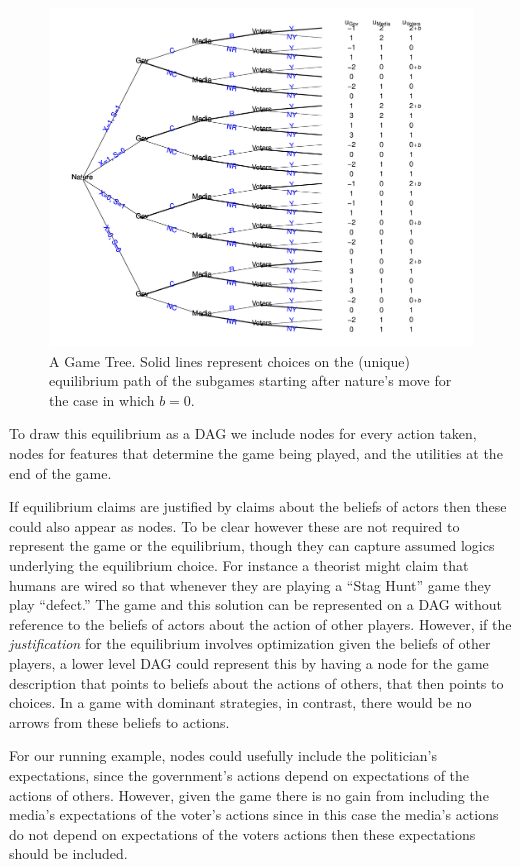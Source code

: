 \documentclass[12pt,]{book}
\begin{document}
\begin{figure}
\centering
\includegraphics{ii_files/figure-latex/tree-1.pdf}
\caption{\label{fig:tree}\label{fig:tree} A Game Tree. Solid lines represent choices on the (unique) equilibrium path of the subgames starting after nature's move for the case in which \(b=0\).}
\end{figure}

To draw this equilibrium as a DAG we include nodes for every action taken, nodes for features that determine the game being played, and the utilities at the end of the game.

If equilibrium claims are justified by claims about the beliefs of actors then these could also appear as nodes. To be clear however these are not required to represent the game or the equilibrium, though they can capture assumed logics underlying the equilibrium choice. For instance a theorist might claim that humans are wired so that whenever they are playing a ``Stag Hunt'' game they play ``defect.'' The game and this solution can be represented on a DAG without reference to the beliefs of actors about the action of other players. However, if the \emph{justification} for the equilibrium involves optimization given the beliefs of other players, a lower level DAG could represent this by having a node for the game description that points to beliefs about the actions of others, that then points to choices. In a game with dominant strategies, in contrast, there would be no arrows from these beliefs to actions.

For our running example, nodes could usefully include the politician's expectations, since the government's actions depend on expectations of the actions of others. However, given the game there is no gain from including the media's expectations of the voter's actions since in this case the media's actions do not depend on expectations of the voters actions then these expectations should be included.
\end{document}
